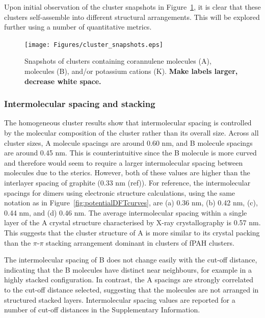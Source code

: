 Upon initial observation of the cluster snapshots in Figure~\ref{fig:clustersnapshots}, it is clear that these clusters self-assemble into different structural arrangements.  This will be explored further using a number of quantitative metrics.
%
\begin{figure}[!tbh]
\centering
\texttt{[image: Figures/cluster\_snapshots.eps]}
\caption{Snapshots of clusters containing corannulene molecules (A),  molecules (B), and/or potassium cations (K). \textbf{Make labels larger, decrease white space.}}
\label{fig:clustersnapshots}
\end{figure}
%

\subsubsection{Intermolecular spacing and stacking} %


The homogeneous cluster results show that intermolecular spacing is controlled by the molecular composition of the cluster rather than its overall size.  Across all cluster sizes, A molecule spacings are around 0.60 nm, and B molecule spacings are around 0.45 nm.  This is counterintuitive since the B molecule is more curved and therefore would seem to require a larger intermolecular spacing between molecules due to the sterics.  However, both of these values are higher than the interlayer spacing of graphite (0.33 nm (ref)). For reference, the intermolecular spacings for dimers using electronic structure calculations, using the same notation as in Figure~\ref{fig:potentialDFTcurves}, are (a) 0.36 nm, (b) 0.42 nm, (c), 0.44 nm, and (d) 0.46 nm. The average intermolecular spacing within a single layer of the A crystal structure characterised by X-ray crystallography is 0.57 nm. This suggests that the cluster structure of A is more similar to its crystal packing than the $\pi$-$\pi$ stacking arrangement dominant in clusters of fPAH clusters.

The intermolecular spacing of B does not change easily with the cut-off distance, indicating that the B molecules have distinct near neighbours, for example in a highly stacked configuration. In contrast, the A spacings are strongly correlated to the cut-off distance selected, suggesting that the molecules are not arranged in structured stacked layers. Intermolecular spacing values are reported for a number of cut-off distances in the Supplementary Information.

